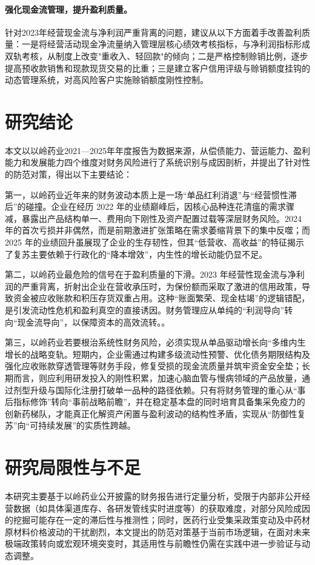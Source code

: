 \documentclass[12pt,a4paper,fontset=windows,UTF8]{ctexart}
\begin{document}
\paragraph*{强化现金流管理，提升盈利质量。}
针对2023年经营现金流与净利润严重背离的问题，建议从以下方面着手改善盈利质量：一是将经营活动现金净流量纳入管理层核心绩效考核指标，与净利润指标形成双轨考核，从制度上改变"重收入、轻回款"的倾向；二是严格控制赊销比例，逐步提高预收款销售和现款现货交易的比重；三是建立客户信用评级与赊销额度挂钩的动态管理系统，对高风险客户实施赊销额度刚性控制。

\section{研究结论}
本文以以岭药业2021—2025年年度报告为数据来源，从偿债能力、营运能力、盈利能力和发展能力四个维度对财务风险进行了系统识别与成因剖析，并提出了针对性的防范对策，得出以下主要结论：

第一，以岭药业近年来的财务波动本质上是一场“单品红利消退”与“经营惯性滞后”的碰撞。企业在经历 2022 年的业绩巅峰后，因核心品种连花清瘟的需求骤减，暴露出产品结构单一、费用向下刚性及资产配置过载等深层财务风险。2024 年的首次亏损并非偶然，而是前期激进扩张策略在需求萎缩背景下的集中反噬；而 2025 年的业绩回升虽展现了企业的生存韧性，但其“低营收、高收益”的特征揭示了复苏主要依赖于行政化的“降本增效”，内生性的增长动能仍显不足。

第二，以岭药业最危险的信号在于盈利质量的下滑。2023 年经营性现金流与净利润的严重背离，折射出企业在营收承压时，为保份额而采取了激进的信用政策，导致资金被应收账款和积压存货双重占用。这种“账面繁荣、现金枯竭”的逻辑错配，是引发流动性危机和盈利真空的直接诱因。财务管理应从单纯的“利润导向”转向“现金流导向”，以保障资本的高效流转。。

第三，以岭药业若要根治系统性财务风险，必须实现从单品驱动增长向“多维内生增长的战略变轨。短期内，企业需通过构建多级流动性预警、优化债务期限结构及强化应收账款穿透管理等财务手段，修复受损的现金流质量并筑牢资金安全垫；长期而言，则应利用研发投入的刚性积累，加速心脑血管与慢病领域的产品放量，通过剂型升级与国际化注册打破单一品种的路径依赖。只有将财务管理的重心从“事后指标修饰”转向“事前战略前瞻”，并在稳定基本盘的同时培育具备集采免疫力的创新药梯队，才能真正化解资产闲置与盈利波动的结构性矛盾，实现从“防御性复苏”向“可持续发展”的实质性跨越。

\section{研究局限性与不足}
本研究主要基于以岭药业公开披露的财务报告进行定量分析，受限于内部非公开经营数据（如具体渠道库存、各研发管线实时进度等）的获取难度，对部分风险成因的挖掘可能存在一定的滞后性与推测性；同时，医药行业受集采政策变动及中药材原材料价格波动的干扰剧烈，本文提出的防范对策基于当前市场逻辑，在面对未来极端政策转向或宏观环境突变时，其适用性与前瞻性仍需在实践中进一步验证与动态调整。
\end{document}
